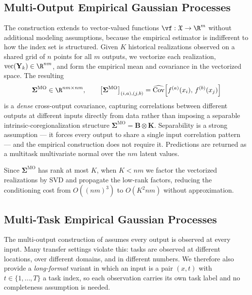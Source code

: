 \subsection{Multi-Output Empirical Gaussian Processes}
\label{apd:multioutput}

The construction extends to vector-valued functions $\vf:\mathfrak{X}\to\R^{m}$
without additional modeling assumptions, because the empirical estimator is
indifferent to how the index set is structured. Given $K$ historical realizations
observed on a shared grid of $n$ points for all $m$ outputs, we vectorize each
realization, $\operatorname{vec}(\mathbf{Y}_k)\in\R^{nm}$, and form the empirical
mean and covariance in the vectorized space. The resulting
\begin{equation}
    \boldsymbol{\Sigma}^{\text{MO}} \in \R^{nm\times nm},
    \qquad
    \big[\boldsymbol{\Sigma}^{\text{MO}}\big]_{(i,a),(j,b)}
    = \widehat{\operatorname{Cov}}\!\left[f^{(a)}(x_i),\, f^{(b)}(x_j)\right]
\end{equation}
is a \emph{dense} cross-output covariance, capturing correlations between
different outputs at different inputs directly from data rather than imposing a
separable intrinsic-coregionalization structure
$\boldsymbol{\Sigma}^{\text{MO}} = \mathbf{B}\otimes\mathbf{K}$. Separability is a
strong assumption --- it forces every output to share a single input correlation
pattern --- and the empirical construction does not require it. Predictions are
returned as a multitask multivariate normal over the $nm$ latent values.

Since $\boldsymbol{\Sigma}^{\text{MO}}$ has rank at most $K$, when $K < nm$ we
factor the vectorized realizations by SVD and propagate the low-rank factors,
reducing the conditioning cost from $O((nm)^3)$ to $O(K^2 nm)$ without
approximation.

\subsection{Multi-Task Empirical Gaussian Processes}
\label{apd:multitask}

The multi-output construction of  assumes every output is
observed at every input. Many transfer settings violate this: tasks are observed
at different locations, over different domains, and in different numbers. We
therefore also provide a \emph{long-format} variant in which an input is a pair
$(x, t)$ with $t\in\{1,\dots,T\}$ a task index, so each observation carries its
own task label and no completeness assumption is needed.

